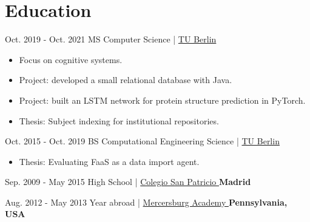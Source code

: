 \documentclass[]{commands}
\begin{document}
\section{Education}
\begin{entrylist}
 
   \entry
    {Oct. 2019 - Oct. 2021}
    {MS Computer Science | }
    { \href{https://www.tu.berlin/en/}{\small TU Berlin \faMousePointer}}
    {}
    {\jobspace
    \begin{itemize}[leftmargin=*, itemsep = 0.1em]
        \item Focus on cognitive systems.
        \item Project: developed a small relational database with Java.
        \item Project: built an LSTM network for protein structure prediction in PyTorch.
        \item Thesis: Subject indexing for institutional repositories.\\
    \end{itemize}}
    
  \entry
    {Oct. 2015 - Oct. 2019}
    {BS Computational Engineering Science | }
    { \href{https://www.tu.berlin/en/}{\small TU Berlin \faMousePointer}}
    {}
    {\jobspace
    \begin{itemize}[leftmargin=*, itemsep = 0.1em]
        \item Thesis: Evaluating FaaS as a data import agent.\\
    \end{itemize}}

  \entry
    {Sep. 2009 - May 2015}
    {High School | }
    { \href{https://colegiosanpatriciomadrid.com/en}{\small Colegio San Patricio \faMousePointer}}    {\normalsize\textbf{\color{ipsgreen}\faMapMarker\space Madrid}}
    {}
    
  \entry
    {Aug. 2012 - May 2013}
    {Year abroad | }
    { \href{https://www.mercersburg.edu/}{\small Mercersburg Academy \faMousePointer}}    {\normalsize\textbf{\color{ipsgreen}\faMapMarker\space Pennsylvania, USA}}
    {}
\end{entrylist}

\end{document}
